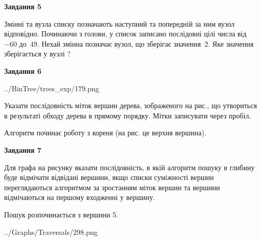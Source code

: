 \documentclass[12pt, ukrainian]{article}
\begin{document}
{\begin {large}
{\begin {center}\textbf{Завдання 5}\end {center}}\par
Змінні  та  вузла списку позначають наступний та попередній за ним вузол відповідно. Починаючи з голови, у список записано послідовні цілі числа від~$-60$ до~$49$. Нехай змінна  позначає вузол, що зберігає значення~$2$.
Яке значення зберігається у вузлі  ?\par
\newpage

{\begin {center}\textbf{Завдання 6}\end {center}}\par

\begin{center}
	{../BinTree/trees_exp/179.png}
\end{center}
Указати послідовність міток вершин дерева, зображеного на рис., що утвориться в результаті обходу дерева в прямому порядку. Мітки записувати через пробіл.\par Алгоритм починає роботу з кореня (на рис. це верхня вершина).\par
\newpage

{\begin {center}\textbf{Завдання 7}\end {center}}\par
Для графа на рисунку вказати послідовність, в якій алгоритм пошуку в глибину буде відмічати відвідані вершини, якщо списки суміжності вершин переглядаються алгоритмом за зростанням міток вершин та вершини відмічаються на першому вход\-женні у вершину.\par
Пошук розпочинається з вершини 5.\par

\begin{center}
	{../Graphs/Traversals/298.png}
\end{center}\par
\newpage


\end{large}}
\end{document}
